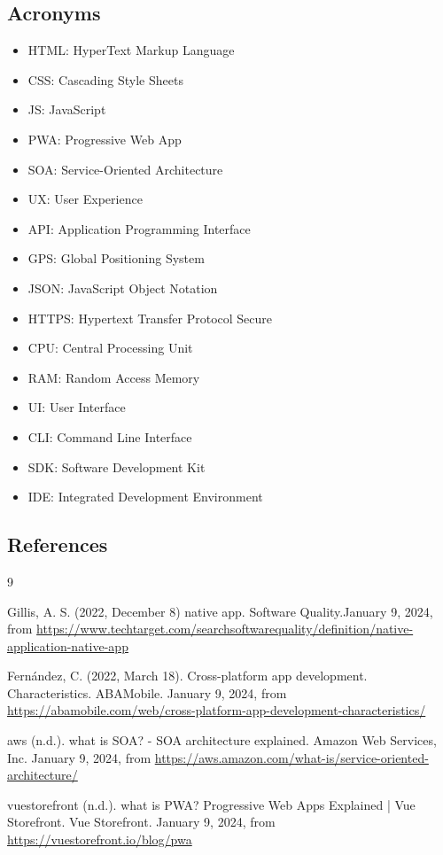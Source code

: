 \documentclass[12pt,a4paper, twosite]{article}
\begin{document}
\subsection{Acronyms}
\label{sec:orgb158e36}

\begin{itemize}
  \item HTML: HyperText Markup Language
  \item CSS: Cascading Style Sheets
  \item JS: JavaScript
  \item PWA: Progressive Web App
  \item SOA: Service-Oriented Architecture
  \item UX: User Experience
  \item API: Application Programming Interface
  \item GPS: Global Positioning System
  \item JSON: JavaScript Object Notation
  \item HTTPS: Hypertext Transfer Protocol Secure
  \item CPU: Central Processing Unit
  \item RAM: Random Access Memory
  \item UI: User Interface
  \item CLI: Command Line Interface
  \item SDK: Software Development Kit
  \item IDE: Integrated Development Environment
\end{itemize}

\subsection{References}
\label{sec:org62711e0}

\begin{thebibliography}
{9}

 Gillis, A. S. (2022, December 8)  native app. Software Quality.January 9, 2024, from \url{https://www.techtarget.com/searchsoftwarequality/definition/native-application-native-app}

 Fernández, C. (2022, March 18). Cross-platform app development. Characteristics. ABAMobile. January 9, 2024, from \url{https://abamobile.com/web/cross-platform-app-development-characteristics/}

 aws (n.d.). what is SOA? - SOA architecture explained. Amazon Web Services, Inc. January 9, 2024, from \url{https://aws.amazon.com/what-is/service-oriented-architecture/}

 vuestorefront (n.d.). what is PWA? Progressive Web Apps Explained | Vue Storefront. Vue Storefront. January 9, 2024, from \url{https://vuestorefront.io/blog/pwa}

\end{thebibliography}
\end{document}
